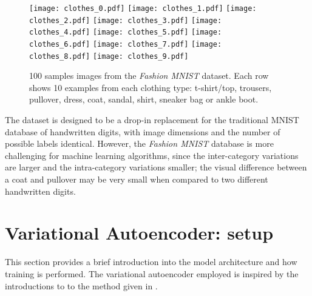 \documentclass[]{article}
\begin{document}
\begin{figure}
  \centering
  \texttt{[image: clothes\_0.pdf]}
  \texttt{[image: clothes\_1.pdf]}
  \texttt{[image: clothes\_2.pdf]}
  \texttt{[image: clothes\_3.pdf]}
  \texttt{[image: clothes\_4.pdf]}
  \texttt{[image: clothes\_5.pdf]}
  \texttt{[image: clothes\_6.pdf]}
  \texttt{[image: clothes\_7.pdf]}
  \texttt{[image: clothes\_8.pdf]}
  \texttt{[image: clothes\_9.pdf]}
  \caption{100 samples images from the \textit{Fashion MNIST} dataset. Each row shows 10 examples from each clothing type: t-shirt/top, trousers, pullover, dress, coat, sandal, shirt, sneaker bag or ankle boot.}
  \label{fig:mnist_fashion}
\end{figure}

The dataset is designed to be a drop-in replacement for the traditional MNIST database of handwritten digits, with image dimensions and the number of possible labels identical. However, the \textit{Fashion MNIST} database is more challenging for machine learning algorithms, since the inter-category variations are larger and the intra-category variations smaller; the visual difference between a coat and pullover may be very small when compared to two different handwritten digits.




\section{Variational Autoencoder: setup}
\label{sec:vae}

This section provides a brief introduction into the model architecture and how training is performed. The variational autoencoder employed is inspired by the introductions to to the method given in \cite{notes, frans, altosaar, shafkat}.
\end{document}
